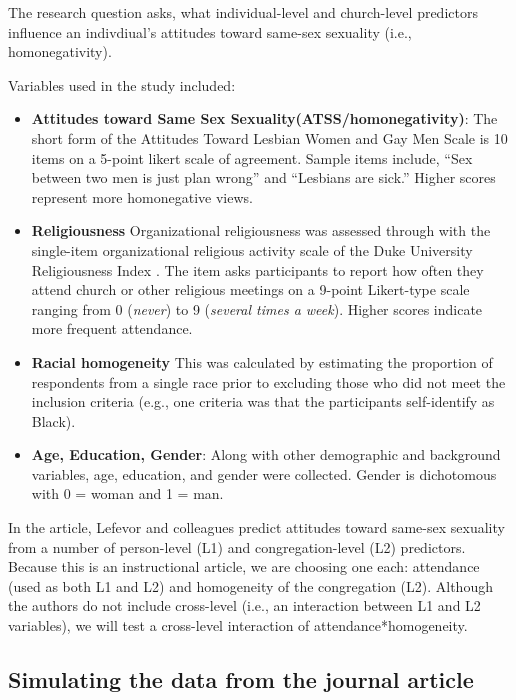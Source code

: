 \documentclass[
  11pt,
]{book}
\begin{document}
The research question asks, what individual-level and church-level predictors influence an indivdiual's attitudes toward same-sex sexuality (i.e., homonegativity).

Variables used in the study included:

\begin{itemize}
\item
  \textbf{Attitudes toward Same Sex Sexuality(ATSS/homonegativity)}: The short form of the Attitudes Toward Lesbian Women and Gay Men Scale \citep{herek_assessing_1994} is 10 items on a 5-point likert scale of agreement. Sample items include, ``Sex between two men is just plan wrong'' and ``Lesbians are sick.'' Higher scores represent more homonegative views.
\item
  \textbf{Religiousness} Organizational religiousness was assessed through with the single-item organizational religious activity scale of the Duke University Religiousness Index \citep{koenig_duke_2010}. The item asks participants to report how often they attend church or other religious meetings on a 9-point Likert-type scale ranging from 0 (\emph{never}) to 9 (\emph{several times a week}). Higher scores indicate more frequent attendance.
\item
  \textbf{Racial homogeneity} This was calculated by estimating the proportion of respondents from a single race prior to excluding those who did not meet the inclusion criteria (e.g., one criteria was that the participants self-identify as Black).
\item
  \textbf{Age, Education, Gender}: Along with other demographic and background variables, age, education, and gender were collected. Gender is dichotomous with 0 = woman and 1 = man.
\end{itemize}

In the article, Lefevor \citeyearpar{lefevor_homonegativity_2020} and colleagues predict attitudes toward same-sex sexuality from a number of person-level (L1) and congregation-level (L2) predictors. Because this is an instructional article, we are choosing one each: attendance (used as both L1 and L2) and homogeneity of the congregation (L2). Although the authors do not include cross-level (i.e., an interaction between L1 and L2 variables), we will test a cross-level interaction of attendance*homogeneity.

\hypertarget{simulating-the-data-from-the-journal-article}{%
\subsection{Simulating the data from the journal article}\label{simulating-the-data-from-the-journal-article}}
\end{document}
